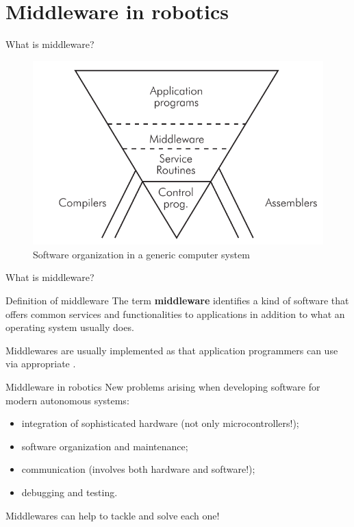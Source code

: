 
\section{Middleware in robotics}
\graphicspath{{figs/section1/}}

\begin{frame}{What is middleware?}
	\begin{figure}
		\centering
		\includegraphics[width=.85\textwidth]{softwarePyramid.png}
		\caption{Software organization in a generic computer system}
		\label{fig:swpyramid}
	\end{figure}
\end{frame}
\begin{frame}{What is middleware?}
	\begin{block}{Definition of middleware}
		\justifying
		The term \textbf{middleware} identifies a kind of software that offers common services and functionalities to applications in addition to what an operating system usually does.
	\end{block}
	\justifying
	Middlewares are usually implemented as  that application programmers can use via appropriate .
\end{frame}

\begin{frame}{Middleware in robotics}
	\justifying
	New problems arising when developing software for modern autonomous systems:
	\begin{itemize}
		\item integration of sophisticated hardware (not only microcontrollers!);
		\item software organization and maintenance;
		\item communication (involves both hardware and software!);
		\item debugging and testing.
	\end{itemize}
	\begin{block}{}
		\centering
		Middlewares can help to tackle and solve each one!
	\end{block}
\end{frame}

